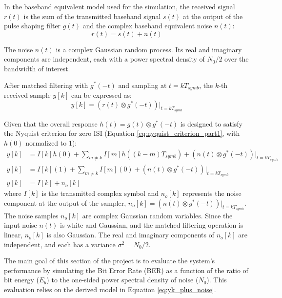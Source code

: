 In the baseband equivalent model used for the simulation, the received signal $r(t)$ is the sum of the transmitted baseband signal $s(t)$ at the output of the pulse shaping filter $g(t)$ and the complex baseband equivalent noise $n(t)$:
\begin{equation}
    r(t) = s(t) + n(t)
\end{equation} \par
The noise $n(t)$ is a complex Gaussian random process. Its real and imaginary components are independent, each with a power spectral density of $N_0/2$ over the bandwidth of interest.\par
After matched filtering with $g^*(-t)$ and sampling at $t = kT_{symb}$, the $k$-th received sample $y[k]$ can be expressed as:
\begin{equation}
    y[k] = (r(t) \otimes g^*(-t))|_{t=kT_{symb}}
\end{equation}
\par
Given that the overall response $h(t) = g(t) \otimes g^*(-t)$ is designed to satisfy the Nyquist criterion for zero ISI (Equation \ref{eq:nyquist_criterion_part1}, with $h(0)$ normalized to 1):
\begin{align}
    y[k] &= I[k]h(0) + \sum_{m \neq k} I[m]h((k-m)T_{symb}) + (n(t) \otimes g^*(-t))|_{t=kT_{symb}} \\
    y[k] &= I[k](1) + \sum_{m \neq k} I[m](0) + (n(t) \otimes g^*(-t))|_{t=kT_{symb}} \\
    y[k] &= I[k] + n_o[k] \label{eq:yk_plus_noise}
\end{align}
where $I[k]$ is the transmitted complex symbol and $n_o[k]$ represents the noise component at the output of the sampler, $n_o[k] = (n(t) \otimes g^*(-t))|_{t=kT_{symb}}$. The noise samples $n_o[k]$ are complex Gaussian random variables. Since the input noise $n(t)$ is white and Gaussian, and the matched filtering operation is linear, $n_o[k]$ is also Gaussian. The real and imaginary components of $n_o[k]$ are independent, and each has a variance $\sigma^2 = N_0/2$. \par

The main goal of this section of the project is to evaluate the system's performance by simulating the Bit Error Rate (BER) as a function of the ratio of bit energy ($E_b$) to the one-sided power spectral density of noise ($N_0$). This evaluation relies on the derived model in Equation \ref{eq:yk_plus_noise}.

